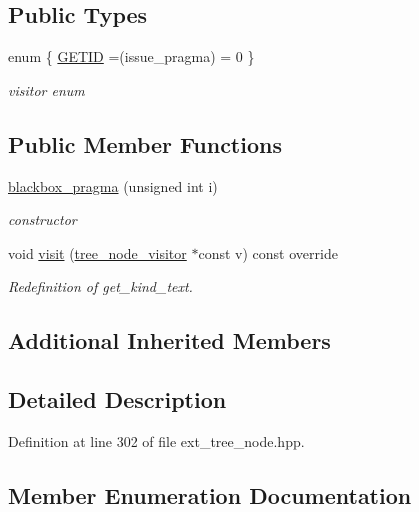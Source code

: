 \subsection*{Public Types}
\begin{DoxyCompactItemize}
\item 
enum \{ \hyperlink{structblackbox__pragma_a1a3fda9ce4c062bba9c74fd4c4760085a26c042cebd6073413393371f205de751}{G\+E\+T\+ID} =(issue\+\_\+pragma) = 0
 \}\begin{DoxyCompactList}\small\item\em visitor enum \end{DoxyCompactList}
\end{DoxyCompactItemize}
\subsection*{Public Member Functions}
\begin{DoxyCompactItemize}
\item 
\hyperlink{structblackbox__pragma_aefe7dbd45022c9193ea86410980dce42}{blackbox\+\_\+pragma} (unsigned int i)
\begin{DoxyCompactList}\small\item\em constructor \end{DoxyCompactList}\item 
void \hyperlink{structblackbox__pragma_a8e85a8856e83d67730225e4a1e3297b9}{visit} (\hyperlink{classtree__node__visitor}{tree\+\_\+node\+\_\+visitor} $\ast$const v) const override
\begin{DoxyCompactList}\small\item\em Redefinition of get\+\_\+kind\+\_\+text. \end{DoxyCompactList}\end{DoxyCompactItemize}
\subsection*{Additional Inherited Members}


\subsection{Detailed Description}


Definition at line 302 of file ext\+\_\+tree\+\_\+node.\+hpp.



\subsection{Member Enumeration Documentation}
\mbox{\label{structblackbox__pragma_a1a3fda9ce4c062bba9c74fd4c4760085}} 
